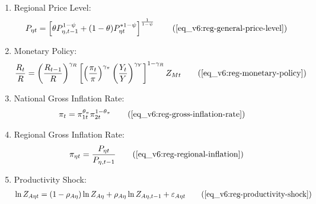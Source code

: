 \documentclass[../thesis.tex]{subfiles}
\begin{document}
{\begin{itemize}
\begin{enumerate}
		\item Regional Price Level:
		\begin{align}
			P_{\eta t} = \left[ \theta P_{\eta,t-1}^{1-\psi} + (1-\theta) P_{\eta t}^{\ast 1-\psi} \right]^\frac{1}{1-\psi} \tag{\ref{eq_v6:reg-general-price-level}}
		\end{align}
		
		\begin{comment}
			\item Intermediate-goods Firms Profit:
			\begin{align}
				\Pi_{\eta t} &= \int_{0}^{1} P_{\eta t} Y_{\eta jt} - W_{\eta t} L_{\eta jt} \dif j \tag{\ref{eq_v6:reg-int-good-firm-profit-total-2}}
			\end{align}	
		\end{comment}
		
		
		
		\item Monetary Policy:
		\begin{align}
			\frac{R_{t}}{R} = \left( \frac{R_{t-1}}{R} \right)^{\gamma_{R}} \left[ \left( \frac{\pi_t}{\pi} \right)^{\gamma_{\pi}} \left( \frac{Y_{t}}{Y} \right)^{\gamma_{Y}} \right]^{1-\gamma_{R}} Z_{Mt} \tag{\ref{eq_v6:reg-monetary-policy}}
		\end{align}
		
		\item National Gross Inflation Rate:
		\begin{align}
			\pi_{t} &= \pi_{1t}^{\theta_{\pi}} \pi_{2t}^{1 - \theta_{\pi}} \tag{\ref{eq_v6:reg-gross-inflation-rate}}
		\end{align}
		
		\begin{comment}
		\item National Price Level:
		\begin{align}
			P_{t} &= \frac{P_{1t} Y_{1t} + P_{2t} Y_{2t}}{Y_{t}} \tag{\ref{eq_v6:reg-national-price-level}} %
		\end{align}			
		\end{comment}
		

		
		\item Regional Gross Inflation Rate:
		\begin{align}
			\pi_{\eta t} = \frac{P_{\eta t}}{P_{\eta, t-1}} \tag{\ref{eq_v6:reg-regional-inflation}}
		\end{align}
		
		\item Productivity Shock:
		\begin{align}
			\ln{Z_{A\eta t}} = (1-\rho_{A\eta})\ln{Z_{A\eta}} + \rho_{A\eta}\ln{Z_{A\eta,t-1}} + \varepsilon_{A\eta t} \tag{\ref{eq_v6:reg-productivity-shock}}
		\end{align}
		

\end{enumerate}
\end{itemize}}
\end{document}
